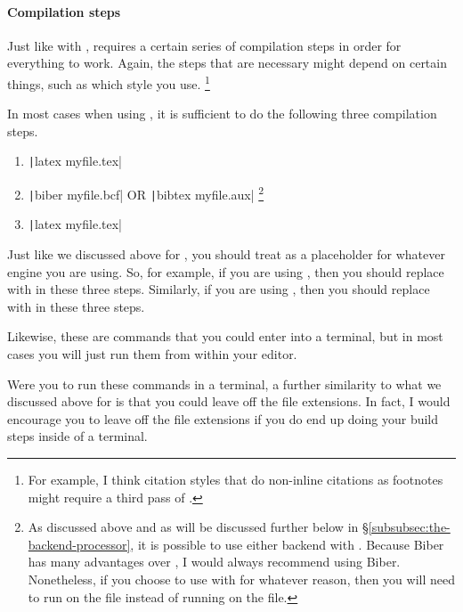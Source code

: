 \paragraph{Compilation steps}

Just like with ,  requires a certain series of compilation steps in order for everything to work.
Again, the steps that are necessary might depend on certain things, such as which style you use.%
\footnote{%
For example, I think citation styles that do non-inline citations as footnotes might require a third pass of .%
}

In most cases when using , it is sufficient to do the following three compilation steps.

\begin{enumerate}[label={(\roman*)}]

	\item{\texttt|latex myfile.tex|}

	\item{\texttt|biber myfile.bcf| OR \texttt|bibtex myfile.aux|%
	\footnote{%
	\label{fn:backends-with-biblatex}%
	As discussed above and as will be discussed further below in \S\ref{subsubsec:the-backend-processor}, it is possible to use either backend with .
	Because Biber has many advantages over , I would always recommend using Biber.
	Nonetheless, if you choose to use  with  for whatever reason, then you will need to run  on the  file instead of running  on the  file.%
	}
	}

	\item{\texttt|latex myfile.tex|}

\end{enumerate}

Just like we discussed above for , you should treat  as a placeholder for whatever engine you are using.
So, for example, if you are using , then you should replace  with  in these three steps.
Similarly, if you are using , then you should replace  with  in these three steps.

Likewise, these are commands that you could enter into a terminal, but in most cases you will just run them from within your editor.

Were you to run these commands in a terminal, a further similarity to what we discussed above for  is that you could leave off the file extensions.
In fact, I would encourage you to leave off the file extensions if you do end up doing your build steps inside of a terminal.

